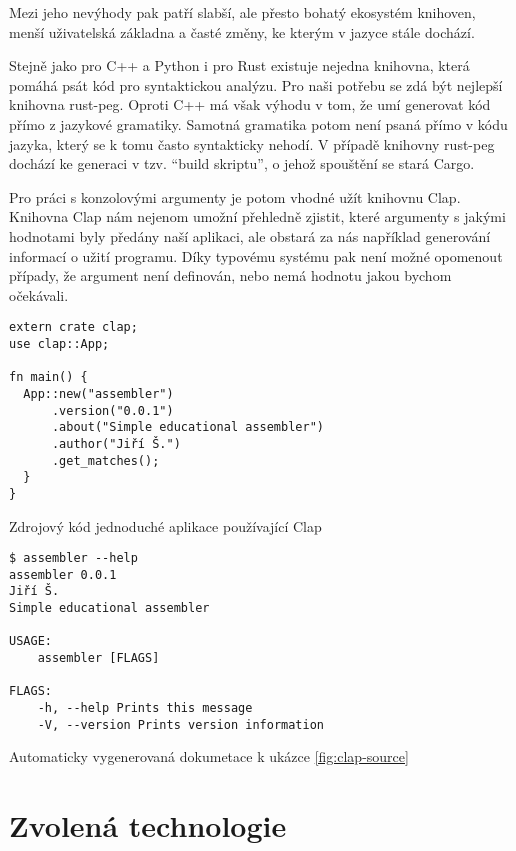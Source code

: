 Mezi jeho nevýhody pak patří slabší, ale přesto bohatý ekosystém knihoven, menší uživatelská základna\cite{so-survey-2018} a časté změny, ke kterým v jazyce stále dochází.

Stejně jako pro C++ a Python i pro Rust existuje nejedna knihovna, která pomáhá psát kód pro syntaktickou analýzu. Pro naši potřebu se zdá být nejlepší knihovna rust-peg\cite{github-rust-peg}. Oproti C++ má však výhodu v tom, že umí generovat kód přímo z jazykové gramatiky. Samotná gramatika potom není psaná přímo v kódu jazyka, který se k tomu často syntakticky nehodí. V případě knihovny rust-peg dochází ke generaci v tzv. ``build skriptu'', o jehož spouštění se stará Cargo.

Pro práci s konzolovými argumenty je potom vhodné užít knihovnu Clap\cite{github-clap}. Knihovna Clap nám nejenom umožní přehledně zjistit, které argumenty s jakými hodnotami byly předány naší aplikaci, ale obstará za nás například generování informací o užití programu. Díky typovému systému pak není možné opomenout případy, že argument není definován, nebo nemá hodnotu jakou bychom očekávali.

\begin{listing}
\begin{verbatim}
extern crate clap;
use clap::App;
 
fn main() {
  App::new("assembler")
      .version("0.0.1")
      .about("Simple educational assembler")
      .author("Jiří Š.")
      .get_matches();
  }
}
\end{verbatim}
\caption{Zdrojový kód jednoduché aplikace používající Clap}
\label{fig:clap-source}
\end{listing}

\begin{listing}
\begin{verbatim}
$ assembler --help
assembler 0.0.1
Jiří Š.
Simple educational assembler

USAGE:
    assembler [FLAGS]

FLAGS:
    -h, --help Prints this message
    -V, --version Prints version information
\end{verbatim}
\caption{Automaticky vygenerovaná dokumetace k ukázce \ref{fig:clap-source}}
\label{fig:clap-output}
\end{listing}

\section{Zvolená technologie}

